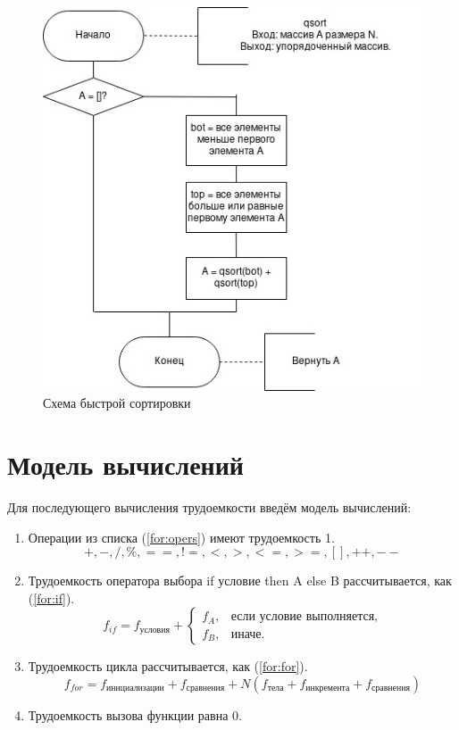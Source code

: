 \documentclass[12pt]{report}
\begin{document}
\begin{figure}[h]
	\centering
	\includegraphics[width=1\linewidth]{qsort.jpg}
	\caption{Схема быстрой сортировки}
	\label{fig:mpr}
\end{figure}


\section{Модель вычислений}

Для последующего вычисления трудоемкости введём модель вычислений:

\begin{enumerate}
	\item Операции из списка (\ref{for:opers}) имеют трудоемкость 1.
	\begin{equation}
	\label{for:opers}
	+, -, /, \%, ==, !=, <, >, <=, >=, [], ++, {-}-
	\end{equation}
	\item Трудоемкость оператора выбора if условие then A else B рассчитывается, как (\ref{for:if}).
	\begin{equation}
	\label{for:if}
	f_{if} = f_{\text{условия}} +
	\begin{cases}
	f_A, & \text{если условие выполняется,}\\
	f_B, & \text{иначе.}
	\end{cases}
	\end{equation}
	\item Трудоемкость цикла рассчитывается, как (\ref{for:for}).
	\begin{equation}
	\label{for:for}
	f_{for} = f_{\text{инициализации}} + f_{\text{сравнения}} + N(f_{\text{тела}} + f_{\text{инкремента}} + f_{\text{сравнения}})
	\end{equation}
	\item Трудоемкость вызова функции равна 0.
\end{enumerate}
\end{document}

